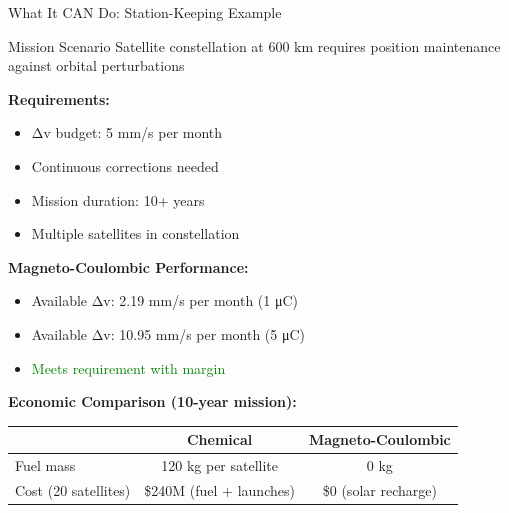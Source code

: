 \documentclass[aspectratio=169]{beamer}
\begin{document}
\begin{frame}{What It CAN Do: Station-Keeping Example}
\begin{block}{Mission Scenario}
Satellite constellation at 600 km requires position maintenance against orbital perturbations
\end{block}

\vspace{0.5em}
\textbf{Requirements:}
\begin{itemize}
    \item Δv budget: 5 mm/s per month
    \item Continuous corrections needed
    \item Mission duration: 10+ years
    \item Multiple satellites in constellation
\end{itemize}

\vspace{0.5em}
\textbf{Magneto-Coulombic Performance:}
\begin{itemize}
    \item Available Δv: 2.19 mm/s per month (1 μC)
    \item Available Δv: 10.95 mm/s per month (5 μC)
    \item \textcolor{green}{\checkmark Meets requirement with margin}
\end{itemize}

\vspace{0.5em}
\textbf{Economic Comparison (10-year mission):}
\begin{table}
\footnotesize
\begin{tabular}{lcc}
\toprule
 & \textbf{Chemical} & \textbf{Magneto-Coulombic} \\
\midrule
Fuel mass & 120 kg per satellite & 0 kg \\
Cost (20 satellites) & \$240M (fuel + launches) & \$0 (solar recharge) \\
\bottomrule
\end{tabular}
\end{table}
\end{frame}
\end{document}
